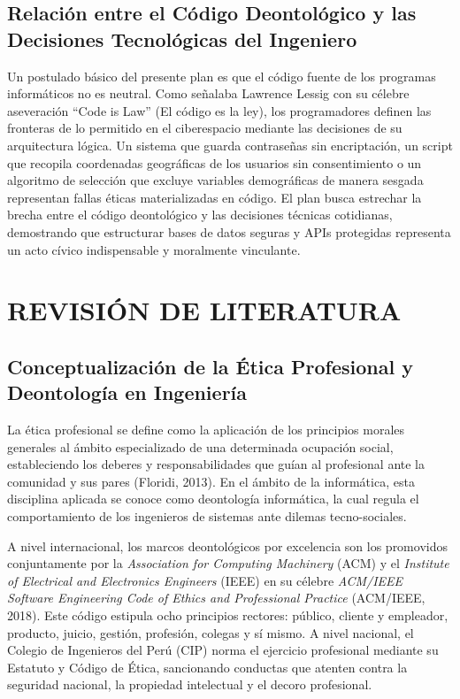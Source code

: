 \documentclass[12pt,a4paper]{article}
\begin{document}
\subsection{Relación entre el Código Deontológico y las Decisiones Tecnológicas del Ingeniero}
Un postulado básico del presente plan es que el código fuente de los programas informáticos no es neutral. Como señalaba Lawrence Lessig con su célebre aseveración ``Code is Law'' (El código es la ley), los programadores definen las fronteras de lo permitido en el ciberespacio mediante las decisiones de su arquitectura lógica. Un sistema que guarda contraseñas sin encriptación, un script que recopila coordenadas geográficas de los usuarios sin consentimiento o un algoritmo de selección que excluye variables demográficas de manera sesgada representan fallas éticas materializadas en código. El plan busca estrechar la brecha entre el código deontológico y las decisiones técnicas cotidianas, demostrando que estructurar bases de datos seguras y APIs protegidas representa un acto cívico indispensable y moralmente vinculante.

\newpage

\section{REVISIÓN DE LITERATURA}
\thispagestyle{empty}

\subsection{Conceptualización de la Ética Profesional y Deontología en Ingeniería}
La ética profesional se define como la aplicación de los principios morales generales al ámbito especializado de una determinada ocupación social, estableciendo los deberes y responsabilidades que guían al profesional ante la comunidad y sus pares (Floridi, 2013). En el ámbito de la informática, esta disciplina aplicada se conoce como deontología informática, la cual regula el comportamiento de los ingenieros de sistemas ante dilemas tecno-sociales.

A nivel internacional, los marcos deontológicos por excelencia son los promovidos conjuntamente por la \textit{Association for Computing Machinery} (ACM) y el \textit{Institute of Electrical and Electronics Engineers} (IEEE) en su célebre \textit{ACM/IEEE Software Engineering Code of Ethics and Professional Practice} (ACM/IEEE, 2018). Este código estipula ocho principios rectores: público, cliente y empleador, producto, juicio, gestión, profesión, colegas y sí mismo. A nivel nacional, el Colegio de Ingenieros del Perú (CIP) norma el ejercicio profesional mediante su Estatuto y Código de Ética, sancionando conductas que atenten contra la seguridad nacional, la propiedad intelectual y el decoro profesional.
\end{document}
